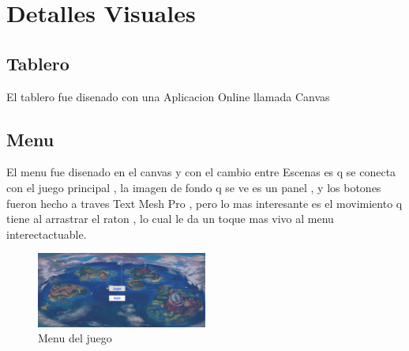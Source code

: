 \documentclass{article}
\begin{document}
\section{Detalles Visuales}
\subsection{Tablero}
El tablero fue disenado con una Aplicacion Online llamada Canvas
\subsection*{Menu}
El menu fue disenado en el canvas y con el cambio entre Escenas es q se conecta con el juego principal , la imagen de fondo q se ve es un panel , y los botones fueron hecho a traves Text Mesh Pro , pero lo mas interesante es el movimiento q tiene al arrastrar el raton , lo cual le da un toque mas vivo al menu interectactuable.
\begin{figure}
\centering
\includegraphics[width =0.5\textwidth]
{3}
\caption{Menu del juego}
\label{fig : a}
\end{figure}
\end{document}
